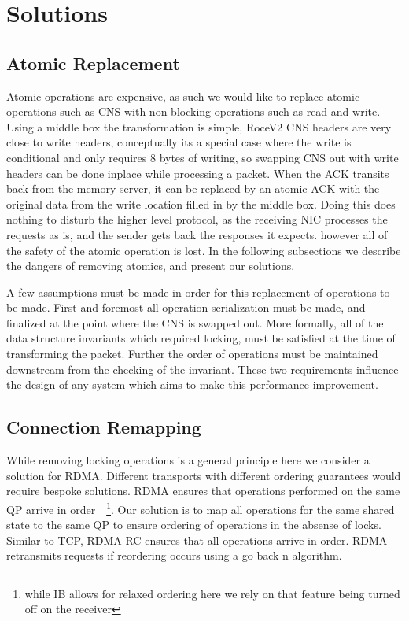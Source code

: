 \section{Solutions}


\subsection{Atomic Replacement} Atomic operations are expensive, as such we
would like to replace atomic operations such as CNS with non-blocking operations
such as read and write. Using a middle box the transformation is simple, RoceV2
CNS headers are very close to write headers, conceptually its a special case
where the write is conditional and only requires 8 bytes of writing, so swapping
CNS out with write headers can be done inplace while processing a packet. When
the ACK transits back from the memory server, it can be replaced by an atomic
ACK with the original data from the write location filled in by the middle box.
Doing this does nothing to disturb the higher level protocol, as the receiving
NIC processes the requests as is, and the sender gets back the responses it
expects. however all of the safety of the atomic operation is lost.  In the
following subsections we describe the dangers of removing atomics, and present
our solutions.

A few assumptions must be made in order for this replacement of operations to be
made. First and foremost all operation serialization must be made, and finalized
at the point where the CNS is swapped out. More formally, all of the data
structure invariants which required locking, must be satisfied at the time of
transforming the packet. Further the order of operations must be maintained
downstream from the checking of the invariant. These two requirements influence
the design of any system which aims to make this performance improvement.


\subsection{Connection Remapping}

While removing locking operations is a general principle here we consider a
solution for RDMA. Different transports with different ordering guarantees would
require bespoke solutions. RDMA ensures that operations performed on the same QP
arrive in order~\cite{infiniband spec}~\footnote{while IB allows for relaxed
ordering here we rely on that feature being turned off on the receiver}. Our
solution is to map all operations for the same shared state to the same QP to
ensure ordering of operations in the absense of locks. Similar to TCP, RDMA RC
ensures that all operations arrive in order. RDMA retransmits requests if
reordering occurs using a go back n algorithm.


